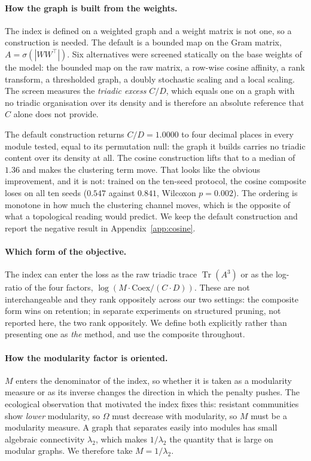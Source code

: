 \documentclass[11pt,a4paper]{article}
\begin{document}
\paragraph{How the graph is built from the weights.} The index is defined on a
weighted graph and a weight matrix is not one, so a construction is needed. The
default is a bounded map on the Gram matrix, $A = \sigma(|WW^\top|)$. Six
alternatives were screened statically on the base weights of the model: the
bounded map on the raw matrix, a row-wise cosine affinity, a rank transform, a
thresholded graph, a doubly stochastic scaling and a local scaling. The screen
measures the \emph{triadic excess} $C/D$, which equals one on a graph with no
triadic organisation over its density and is therefore an absolute reference
that $C$ alone does not provide.

The default construction returns $C/D = 1.0000$ to four decimal places in every
module tested, equal to its permutation null: the graph it builds carries no
triadic content over its density at all. The cosine construction lifts that to a
median of $1.36$ and makes the clustering term move. That looks like the obvious
improvement, and it is not: trained on the ten-seed protocol, the cosine
composite loses on all ten seeds ($0.547$ against $0.841$, Wilcoxon $p=0.002$).
The ordering is monotone in how much the clustering channel moves, which is the
opposite of what a topological reading would predict. We keep the default
construction and report the negative result in Appendix~\ref{app:cosine}.

\paragraph{Which form of the objective.} The index can enter the loss as the
raw triadic trace $\operatorname{Tr}(A^3)$ or as the log-ratio of the four
factors, $\log(M \cdot \mathrm{Coex} / (C \cdot D))$. These are not
interchangeable and they rank oppositely across our two settings: the composite
form wins on retention; in separate experiments on structured pruning, not
reported here, the two rank oppositely. We define both explicitly rather than
presenting one as \emph{the} method, and use the composite throughout.

\paragraph{How the modularity factor is oriented.} $M$ enters the denominator of
the index, so whether it is taken as a modularity measure or as its inverse
changes the direction in which the penalty pushes. The ecological observation
that motivated the index fixes this: resistant communities show \emph{lower}
modularity, so $\Omega$ must decrease with modularity, so $M$ must be a
modularity measure. A graph that separates easily into modules has small
algebraic connectivity $\lambda_2$, which makes $1/\lambda_2$ the quantity that
is large on modular graphs. We therefore take $M = 1/\lambda_2$.
\end{document}
